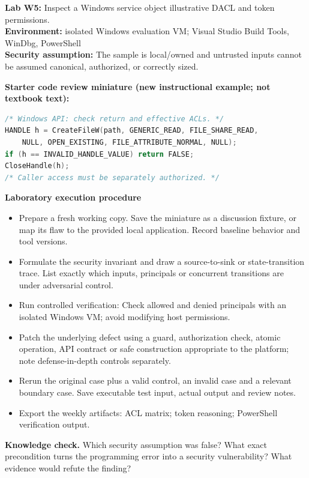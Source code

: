 \documentclass[10pt,letterpaper]{article}
\begin{document}
\begin{insight}\textbf{Lab W5:} Inspect a Windows service object illustrative DACL and token permissions.\\\textbf{Environment:} isolated Windows evaluation VM; Visual Studio Build Tools, WinDbg, PowerShell\\\textbf{Security assumption:} The sample is local/owned and untrusted inputs cannot be assumed canonical, authorized, or correctly sized.\end{insight}
\textbf{Starter code review miniature (new instructional example; not textbook text):}
\begin{lstlisting}[language=C]
/* Windows API: check return and effective ACLs. */
HANDLE h = CreateFileW(path, GENERIC_READ, FILE_SHARE_READ,
    NULL, OPEN_EXISTING, FILE_ATTRIBUTE_NORMAL, NULL);
if (h == INVALID_HANDLE_VALUE) return FALSE;
CloseHandle(h);
/* Caller access must be separately authorized. */
\end{lstlisting}
\textbf{Laboratory execution procedure}
\begin{itemize}[leftmargin=*,itemsep=2pt]
\item Prepare a fresh working copy. Save the miniature as a discussion fixture, or map its flaw to the provided local application. Record baseline behavior and tool versions.
\item Formulate the security invariant and draw a source-to-sink or state-transition trace. List exactly which inputs, principals or concurrent transitions are under adversarial control.
\item Run controlled verification: Check allowed and denied principals with an isolated Windows VM; avoid modifying host permissions.
\item Patch the underlying defect using a guard, authorization check, atomic operation, API contract or safe construction appropriate to the platform; note defense-in-depth controls separately.
\item Rerun the original case plus a valid control, an invalid case and a relevant boundary case. Save executable test input, actual output and review notes.
\item Export the weekly artifacts: ACL matrix; token reasoning; PowerShell verification output.
\end{itemize}
\textbf{Knowledge check.} Which security assumption was false? What exact precondition turns the programming error into a security vulnerability? What evidence would refute the finding?
\end{document}
